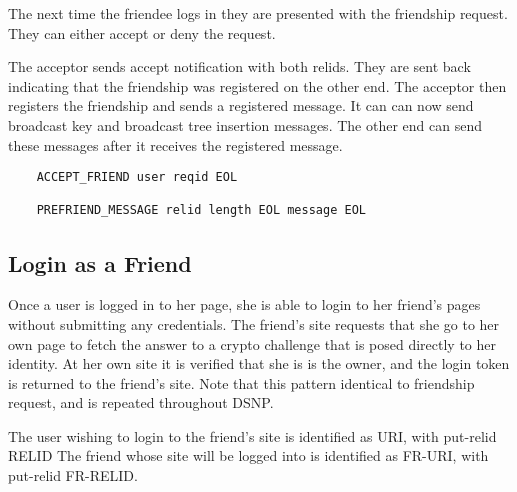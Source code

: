 \documentclass[letterpaper,11pt,oneside]{article}
\begin{document}
The next time the friendee logs in they are presented with the friendship
request. They can either accept or deny the request. 

The acceptor sends accept notification with both relids. They are sent back
indicating that the friendship was registered on the other end. The acceptor
then registers the friendship and sends a registered message. It can can now
send broadcast key and broadcast tree insertion messages. The other end can
send these messages after it receives the registered message.

\vspace{10pt}
\begin{verbatim}
    ACCEPT_FRIEND user reqid EOL

    PREFRIEND_MESSAGE relid length EOL message EOL
\end{verbatim}

\subsection{Login as a Friend}

Once a user is logged in to her page, she is able to login to her friend's
pages without submitting any credentials. The friend's site requests that she
go to her own page to fetch the answer to a crypto challenge that is posed
directly to her identity. At her own site it is verified that she is is the
owner, and the login token is returned to the friend's site. Note that this
pattern identical to friendship request, and is repeated throughout DSNP.

The user wishing to login to the friend's site is identified as URI, with
put-relid RELID The friend whose site will be logged into is identified as
FR-URI, with put-relid FR-RELID.
\end{document}
